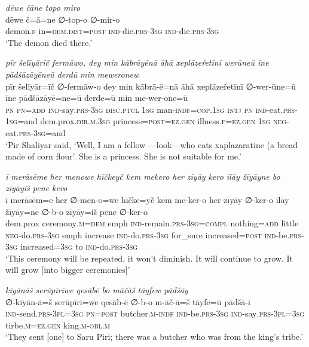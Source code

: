 \ea \label{ŽP.202}
\textit{dēwe čāne topo miro} \\ 
\gll dēwe č=ā=ne ∅-top-o ∅-mir-o \\ 
 demon\textsc{.f} in=\textsc{dem.dist}\textsc{=\textsc{post}} \textsc{ind-}die\textsc{.prs}\textsc{-3sg} \textsc{ind-}die\textsc{.prs}\textsc{-3sg} \\ 
\glt `The demon died there.'
\z 
 
\ea \label{ŽP.210}
\textit{pīr šelīyārīč fermāwo, dey min kābrāyēnā āhā xeplāzeřetīnī werūneū īne pādšāzāyēneū derdū min meweronew} \\ 
\gll pīr šelīyār=īč ∅-fermāw-o dey min kābrā-ē=nā āhā xeplāzeřetīnī ∅-wer-ūne=ū īne pādšāzāyē=ne=ū derde=ū min me-wer-one=ū \\ 
 \textsc{pn} \textsc{pn}\textsc{=add} \textsc{ind-}say\textsc{.prs}\textsc{-3sg} \textsc{disc.ptcl} \textsc{1sg} man\textsc{-indf}\textsc{=cop}\textsc{.\textsc{1sg}} \textsc{intj} \textsc{pn} \textsc{ind-}eat\textsc{.prs}\textsc{-\textsc{1sg}}=and dem.prox\textsc{.dir}\textsc{.m}\textsc{.3sg} princess\textsc{=\textsc{post}}\textsc{\textsc{=ez.gen}} illness\textsc{.f}\textsc{\textsc{=ez.gen}} \textsc{1sg} \textsc{neg-}eat\textsc{.prs}\textsc{-3sg}=and \\ 
\glt `Pir Shaliyar said, ‘Well, I am a fellow —look—who eats xaplazaratine (a bread made of corn flour’. She is a princess. She is not suitable for me.'
\z 
 
\ea \label{ŽP.245}
\textit{ī merāsēme her menowe hīčkeyč kem mekero her zīyāy kero īlāy žīyāyne bo zīyāyiš pene kero} \\ 
\gll ī merāsēm=e her ∅-men-o=we hīčke=yč kem me-ker-o her zīyāy ∅-ker-o īlāy žīyāy=ne ∅-b-o zīyāy=iš pene ∅-ker-o \\ 
 dem.prox ceremony\textsc{.m}\textsc{=dem} emph \textsc{ind-}remain\textsc{.prs}\textsc{-3sg}\textsc{=compl} nothing\textsc{=add} little \textsc{neg-}do\textsc{.prs}\textsc{-3sg} emph increase \textsc{ind-}do\textsc{.prs}\textsc{-3sg} for\_sure increased\textsc{=\textsc{post}} \textsc{ind-}be\textsc{.prs}\textsc{-3sg} increased\textsc{=3sg} to \textsc{ind-}do\textsc{.prs}\textsc{-3sg} \\ 
\glt `This ceremony will be repeated, it won’t diminish. It will continue to grow. It will grow [into bigger ceremonies]'
\z 
 
\ea \label{ŽP.251}
\textit{kīyānāš serūpīrīwe qesābē bo māčāš tāyfew pādšāy} \\ 
\gll ∅-kīyān-ā=š serūpīrī=we qesāb-ē ∅-b-o m-āč-ā=š tāyfe=ū pādšā-ī \\ 
 \textsc{ind-}send\textsc{.prs}\textsc{-3pl}\textsc{=3sg} \textsc{pn}\textsc{=\textsc{post}} butcher\textsc{.m}\textsc{-indf} \textsc{ind-}be\textsc{.prs}\textsc{-3sg} \textsc{ind-}say\textsc{.prs}\textsc{-3pl}\textsc{=3sg} tirbe\textsc{.m}\textsc{\textsc{=ez.gen}} king\textsc{.m}\textsc{-obl}\textsc{.m} \\ 
\glt `They sent [one] to Saru Piri; there was a butcher who was from the king’s tribe.'
\z 
 
